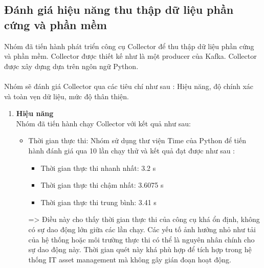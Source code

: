 \subsection{Đánh giá hiệu năng thu thập dữ liệu phần cứng và phần mềm}
\noindent Nhóm đã tiến hành phát triển công cụ Collector để thu thập dữ liệu phần cứng và phần mềm. Collector được thiết kế như là một producer của Kafka. Collector được xây dựng dựa trên ngôn ngữ Python.\\ \\
Nhóm sẽ đánh giá Collector qua các tiêu chí như sau : Hiệu năng, độ chính xác và toàn vẹn dữ liệu, mức độ thân thiện.
\begin{enumerate}
    \item \textbf{Hiệu năng}\\
    Nhóm đã tiến hành chạy Collector với kết quả như sau:
    \begin{itemize}[label=--]
        \item Thời gian thực thi:
        Nhóm sử dụng thư viện Time của Python để tiến hành đánh giá qua 10 lần chạy thử và kết quả đạt được như sau :
        \begin{itemize}[label=\textbullet]
            \item Thời gian thực thi nhanh nhất: 3.2 s
            \item Thời gian thực thi chậm nhất: 3.6075 s
            \item Thời gian thực thi trung bình: 3.41 s
        \end{itemize}
        => Điều này cho thấy thời gian thực thi của công cụ khá ổn định, không có sự dao động lớn giữa các lần chạy. Các yếu tố ảnh hưởng nhỏ như tải của hệ thống hoặc môi trường thực thi có thể là nguyên nhân chính cho sự dao động này. Thời gian quét này khá phù hợp để tích hợp trong hệ thống IT asset management mà không gây gián đoạn hoạt động.


\end{itemize}
\end{enumerate}
